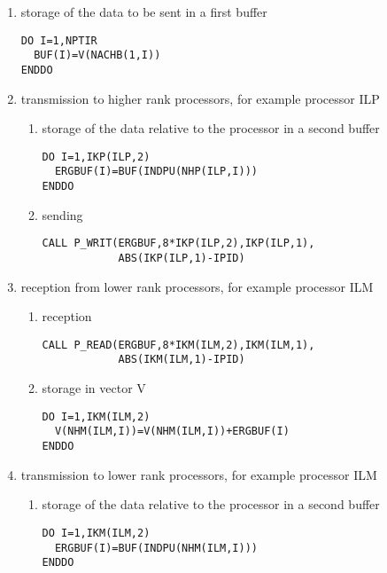 \begin{enumerate}
  \item storage of the data to be sent in a first buffer
  \begin{lstlisting}[language=TelFortran]
DO I=1,NPTIR
  BUF(I)=V(NACHB(1,I))
ENDDO
  \end{lstlisting}

  \item transmission to higher rank processors, for example processor ILP
  \begin{enumerate}
    \item storage of the data relative to the processor in a second buffer

    \begin{lstlisting}[language=TelFortran]
DO I=1,IKP(ILP,2)
  ERGBUF(I)=BUF(INDPU(NHP(ILP,I)))
ENDDO
    \end{lstlisting}

    \item sending
    \begin{lstlisting}[language=TelFortran]
CALL P_WRIT(ERGBUF,8*IKP(ILP,2),IKP(ILP,1),
            ABS(IKP(ILP,1)-IPID)
    \end{lstlisting}
  \end{enumerate}
  \item reception from lower rank processors, for example processor ILM
  \begin{enumerate}
    \item reception
    \begin{lstlisting}[language=TelFortran]
CALL P_READ(ERGBUF,8*IKM(ILM,2),IKM(ILM,1),
            ABS(IKM(ILM,1)-IPID)
    \end{lstlisting}

    \item storage in vector V
    \begin{lstlisting}[language=TelFortran]
DO I=1,IKM(ILM,2)
  V(NHM(ILM,I))=V(NHM(ILM,I))+ERGBUF(I)
ENDDO
    \end{lstlisting}
  \end{enumerate}

  \item transmission to lower rank processors, for example processor ILM

  \begin{enumerate}
    \item storage of the data relative to the processor in a second buffer

    \begin{lstlisting}[language=TelFortran]
DO I=1,IKM(ILM,2)
  ERGBUF(I)=BUF(INDPU(NHM(ILM,I)))
ENDDO
    \end{lstlisting}


\end{enumerate}
\end{enumerate}
